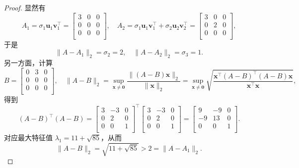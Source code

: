 \begin{proof}
    显然有 \[
A_1 = \sigma_1 \boldsymbol{u}_1 \boldsymbol{v}_1^\top = \begin{bmatrix}
    3 & 0 & 0 \\
    0 & 0 & 0 \\
    0 & 0 & 0 \\
\end{bmatrix}, \quad A_2 = \sigma_1 \boldsymbol{u}_1 \boldsymbol{v}_1^\top + \sigma_2 \boldsymbol{u}_2 \boldsymbol{v}_2^\top = \begin{bmatrix}
    3 & 0 & 0 \\
    0 & 2 & 0 \\
    0 & 0 & 0 \\
\end{bmatrix},
    \]
    于是 \[
\|A - A_1\|_2 = \sigma_2 = 2, \quad \|A - A_2\|_2 = \sigma_3 = 1.
    \]
    另一方面，计算 \[B = \begin{bmatrix}
        0 & 3 & 0 \\
        0 & 0 & 0 \\
        0 & 0 & 0 \\
    \end{bmatrix}, \quad \|A - B\|_2 = \sup_{\boldsymbol{x} \neq \boldsymbol{0}} \frac{\|(A - B)\boldsymbol{x}\|_2}{\|\boldsymbol{x}\|_2} = \sup_{\boldsymbol{x} \neq \boldsymbol{0}} \sqrt{\frac{\boldsymbol{x}^\top (A - B)^\top (A - B) \boldsymbol{x}}{\boldsymbol{x}^\top \boldsymbol{x}}},\]得到 \[
(A - B)^\top (A - B) = \begin{bmatrix}
    3 & -3 & 0 \\
    0 & 2 & 0 \\
    0 & 0 & 1 \\
\end{bmatrix}^\top \begin{bmatrix}
    3 & -3 & 0 \\
    0 & 2 & 0 \\
    0 & 0 & 1 \\
\end{bmatrix} = \begin{bmatrix}
    9 & -9 & 0 \\
    -9 & 13 & 0 \\
    0 & 0 & 1 \\
\end{bmatrix}.
\]
对应最大特征值 $\lambda_1 = 11 + \sqrt{85}$，从而 \[\|A - B\|_2 = \sqrt{11 + \sqrt{85}} > 2 = \|A - A_1\|_2.\]
\end{proof}
